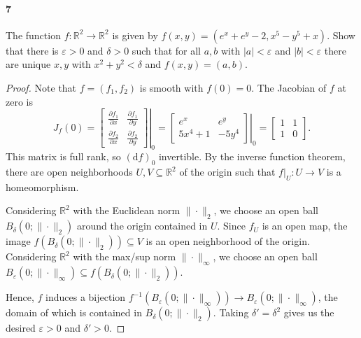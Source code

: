 \documentclass[12pt]{article}
\newlength{\myparskip}
\newenvironment{fullbox}{\begin{lrbox}{\savefullbox}\begin{minipage}{\dimexpr\textwidth-2\fboxsep\relax}\setlength{\parskip}{\myparskip}}{\end{minipage}\end{lrbox}\framebox[\textwidth]{\usebox{\savefullbox}}}
\newenvironment{pbox}[1][]{\begin{fullbox}\ifx#1\empty\else\paragraph{#1}\phantom{}\fi}{\end{fullbox}}
\theoremstyle{definition}
\newcommand{\R}{\mathbb{R}}
\newcommand{\eps}{\varepsilon}
\newcommand{\<}{\langle}
\renewcommand{\>}{\rangle}
\newcommand{\seq}{\subseteq}
\newcommand{\dd}{\mathrm{d}}
\newcommand{\pdv}[2]{\frac{\partial #1}{\partial #2}}
\newcommand{\mat}[1]{\begin{bmatrix}#1\end{bmatrix}}
\begin{document}
\begin{pbox}[7]
    The function $f : \R^2 \to \R^2$ is given by $f(x, y) = (e^x+ e^y - 2, x^5 - y^5 + x)$.
    Show that there is $\eps > 0$ and $\delta > 0$ such that for all $a, b$ with $|a| < \eps$ and $|b| < \eps$ there are unique $x, y$ with $x^2 + y^2 < \delta$ and $f(x, y) = (a, b)$.
\end{pbox}

\begin{proof}
    Note that $f = (f_1, f_2)$ is smooth with $f(0) = 0$.
    The Jacobian of $f$ at zero is
    \[
        J_f(0)
            = \left.\mat{\pdv{f_1}{x} & \pdv{f_1}{y} \\ \pdv{f_2}{x} & \pdv{f_2}{y}}\right|_{0} 
            = \left.\mat{e^x & e^y \\ 5x^4 + 1 & -5y^4}\right|_{0} 
            = \mat{1 & 1 \\ 1 & 0}.
    \]
    This matrix is full rank, so $(\dd{f})_{0}$ invertible.
    By the inverse function theorem, there are open neighborhoods $U, V \seq \R^2$ of the origin such that $f|_U : U \to V$ is a homeomorphism.

    Considering $\R^2$ with the Euclidean norm $\|\cdot\|_2$, we choose an open ball $B_\delta(0; \|\cdot\|_2)$ around the origin contained in $U$.
    Since $f_U$ is an open map, the image $f(B_\delta(0; \|\cdot\|_2)) \seq V$ is an open neighborhood of the origin.
    Considering $\R^2$ with the max/sup norm $\|\cdot\|_\infty$, we choose an open ball $B_\eps(0; \|\cdot\|_\infty) \seq f(B_\delta(0; \|\cdot\|_2))$.
    
    Hence, $f$ induces a bijection $f^{-1}(B_\eps(0; \|\cdot\|_\infty)) \to B_\eps(0; \|\cdot\|_\infty)$, the domain of which is contained in $B_\delta(0; \|\cdot\|_2)$.
    Taking $\delta' = \delta^2$ gives us the desired $\eps > 0$ and $\delta' > 0$.
\end{proof}
\end{document}
